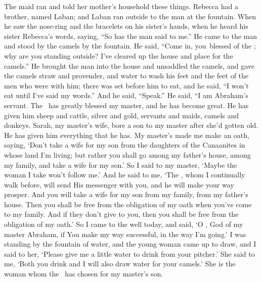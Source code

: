 \begin{inparaenum}
   The maid ran and told her mother's household these things.%
   Rebecca had a brother, named Laban; and Laban ran outside to the man at the fountain.%
   When he saw the nose-ring and the bracelets on his sister's hands, when he heard his sister Rebecca's words, saying, ``So has the man said to me.'' He came to the man and stood by the camels by the fountain.%
   He said, ``Come in, you\understood{}\ blessed of the \lord; why are you standing outside? I've cleared up the house and place for the camels.''%
   He brought the man into the house and unsaddled the camels, and gave the camels straw and provender, and water to wash his feet and the feet of the men who were with him;%
   there was set before him to eat, and he said, ``I won't eat until I've said my words.'' And he said, ``Speak.''%
   He said, ``I am Abraham's servant.%
   The \lord\ has greatly blessed my master, and he has become great. He has given him sheep and cattle, silver and gold, servants and maids, camels and donkeys.%
   Sarah, my master's wife, bore a son to my master after she'd gotten old. He has given him everything that he has.%
   My master's made me make an oath, saying, `Don't take a wife for my son from the daughters of the Canaanites in whose land I'm living;%
   but rather you shall go among my father's house, among my family, and take a wife for my son.'%
   So I said to my master, `Maybe the woman I take won't follow me.'%
   And he said to me, `The \lord, whom I continually walk before, will send His messenger with you, and he will make your way prosper. And you will take a wife for my son from my family, from my father's house.%
   Then you shall be free from the obligation of my oath when you've come to my family. And if they don't give to you, then you shall be free from the obligation of my oath.'%
   So I came to the well today, and said, `O \lord, God of my master Abraham, if You make my way successful, in the way I'm going.'%
   I was standing by the fountain of water, and the young woman came up to draw, and I said to her, `Please give me a little water to drink from your pitcher.'%
   She said to me, `Both you drink and I will also draw water for your camels.' She is the woman whom the \lord\ has chosen for my master's son.%

\end{inparaenum}

